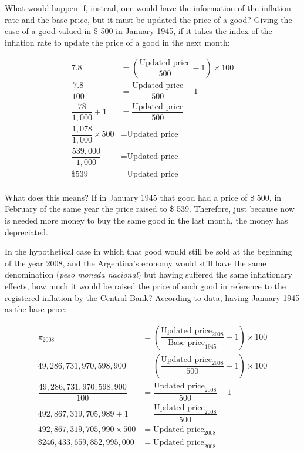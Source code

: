\documentclass[12pt,a4paper,twoside]{book}
\begin{document}
What would happen if, instead, one would have the information of the inflation rate and the base price, but it must be updated the price of a good? Giving the case of a good valued in \$ 500 in January 1945, if it takes the index of the inflation rate to update the price of a good in the next month:

\begin{align*}
7.8 &= \left( \dfrac{\text{Updated price}}{500} - 1 \right) \times 100 \\
\dfrac{7.8}{100} &= \dfrac{\text{Updated price}}{500} - 1 \\
\dfrac{78}{1,000} + 1 &= \dfrac{\text{Updated price}}{500} \\
\dfrac{1,078}{1,000} \times 500 &= \text{Updated price} \\
\dfrac{539,000}{1,000} &= \text{Updated price} \\
\text{\$ } 539 &= \text{Updated price} \\
\end{align*}

What does this means? If in January 1945 that good had a price of \$ 500, in February of the same year the price raised to \$ 539. Therefore, just because now is needed more money to buy the same good in the last month, the money has depreciated.

In the hypothetical case in which that good would still be sold at the beginning of the year 2008, and the Argentina's economy would still have the same denomination (\textit{peso moneda nacional}) but having suffered the same inflationary effects, how much it would be raised the price of such good in reference to the registered inflation by the Central Bank? According to data, having January 1945 as the base price:

\begin{align*}
\pi_{2008} &= \left( \dfrac{\text{Updated price}_{2008}}{\text{Base price}_{1945}} - 1 \right) \times 100 \\
49,286,731,970,598,900 &= \left( \dfrac{\text{Updated price}_{2008}}{500} - 1 \right) \times 100 \\
\dfrac{49,286,731,970,598,900}{100} &= \dfrac{\text{Updated price}_{2008}}{500} - 1 \\
492,867,319,705,989 + 1 &= \dfrac{\text{Updated price}_{2008}}{500} \\
492,867,319,705,990 \times 500 &= \text{Updated price}_{2008} \\
\text{\$ } 246,433,659,852,995,000 &= \text{Updated price}_{2008} \\
\end{align*}
\end{document}
